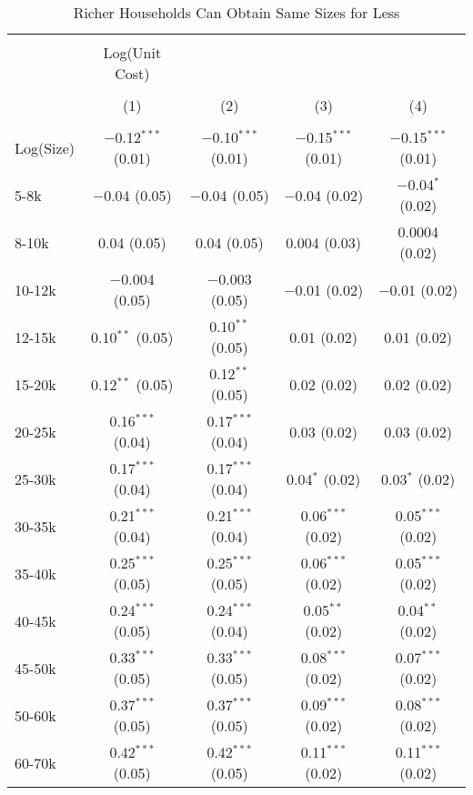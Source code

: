 
\begin{table}[!htbp] \centering 
  \caption{Richer Households Can Obtain Same Sizes for Less} 
  \label{tab:IncUnitCost} 
\begin{tabular}{@{\extracolsep{5pt}}lcccc} 
\\[-1.8ex]\hline 
\hline \\[-1.8ex] 
 & Log(Unit Cost) &  &  &  \\ 
\\[-1.8ex] & (1) & (2) & (3) & (4)\\ 
\hline \\[-1.8ex] 
 Log(Size) & $-$0.12$^{***}$ (0.01) & $-$0.10$^{***}$ (0.01) & $-$0.15$^{***}$ (0.01) & $-$0.15$^{***}$ (0.01) \\ 
  5-8k & $-$0.04 (0.05) & $-$0.04 (0.05) & $-$0.04 (0.02) & $-$0.04$^{*}$ (0.02) \\ 
  8-10k & 0.04 (0.05) & 0.04 (0.05) & 0.004 (0.03) & 0.0004 (0.02) \\ 
  10-12k & $-$0.004 (0.05) & $-$0.003 (0.05) & $-$0.01 (0.02) & $-$0.01 (0.02) \\ 
  12-15k & 0.10$^{**}$ (0.05) & 0.10$^{**}$ (0.05) & 0.01 (0.02) & 0.01 (0.02) \\ 
  15-20k & 0.12$^{**}$ (0.05) & 0.12$^{**}$ (0.05) & 0.02 (0.02) & 0.02 (0.02) \\ 
  20-25k & 0.16$^{***}$ (0.04) & 0.17$^{***}$ (0.04) & 0.03 (0.02) & 0.03 (0.02) \\ 
  25-30k & 0.17$^{***}$ (0.04) & 0.17$^{***}$ (0.04) & 0.04$^{*}$ (0.02) & 0.03$^{*}$ (0.02) \\ 
  30-35k & 0.21$^{***}$ (0.04) & 0.21$^{***}$ (0.04) & 0.06$^{***}$ (0.02) & 0.05$^{***}$ (0.02) \\ 
  35-40k & 0.25$^{***}$ (0.05) & 0.25$^{***}$ (0.05) & 0.06$^{***}$ (0.02) & 0.05$^{***}$ (0.02) \\ 
  40-45k & 0.24$^{***}$ (0.05) & 0.24$^{***}$ (0.04) & 0.05$^{**}$ (0.02) & 0.04$^{**}$ (0.02) \\ 
  45-50k & 0.33$^{***}$ (0.05) & 0.33$^{***}$ (0.05) & 0.08$^{***}$ (0.02) & 0.07$^{***}$ (0.02) \\ 
  50-60k & 0.37$^{***}$ (0.05) & 0.37$^{***}$ (0.05) & 0.09$^{***}$ (0.02) & 0.08$^{***}$ (0.02) \\ 
  60-70k & 0.42$^{***}$ (0.05) & 0.42$^{***}$ (0.05) & 0.11$^{***}$ (0.02) & 0.11$^{***}$ (0.02) \\ 

\end{tabular}
\end{table}
